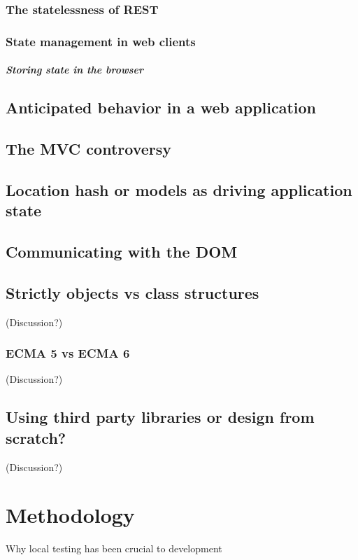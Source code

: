 \documentclass[english]{ifimaster}
\begin{document}
\subsection{The statelessness of REST}

\subsection{State management in web clients}
\paragraph{Storing state in the browser}

\section{Anticipated behavior in a web application}

\section{The MVC controversy}
\section{Location hash or models as driving application state}

\section{Communicating with the DOM}

\section{Strictly objects vs class structures} (Discussion?)
\subsection{ECMA 5 vs ECMA 6} (Discussion?)

\section{Using third party libraries or design from scratch?} (Discussion?)

\chapter{Methodology}
Why local testing has been crucial to development 
\end{document}
